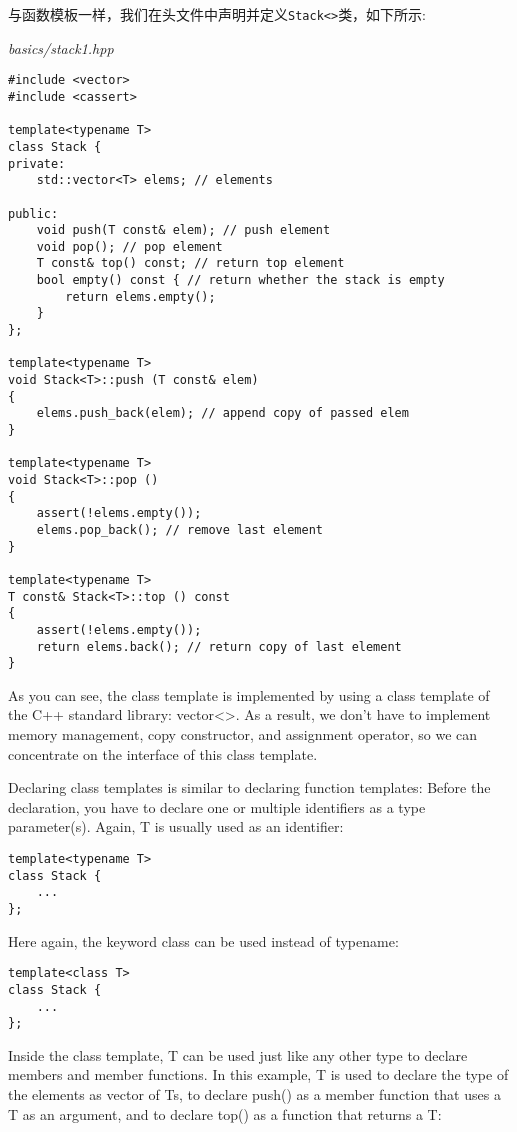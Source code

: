 
与函数模板一样，我们在头文件中声明并定义\texttt{Stack<>}类，如下所示:

\noindent
\textit{basics/stack1.hpp}
\begin{lstlisting}[style=styleCXX]
#include <vector>
#include <cassert>

template<typename T>
class Stack {
private:
	std::vector<T> elems; // elements
	
public:
	void push(T const& elem); // push element
	void pop(); // pop element
	T const& top() const; // return top element
	bool empty() const { // return whether the stack is empty
		return elems.empty();
	}
};

template<typename T>
void Stack<T>::push (T const& elem)
{
	elems.push_back(elem); // append copy of passed elem
}

template<typename T>
void Stack<T>::pop ()
{
	assert(!elems.empty());
	elems.pop_back(); // remove last element
}

template<typename T>
T const& Stack<T>::top () const
{
	assert(!elems.empty());
	return elems.back(); // return copy of last element
}
\end{lstlisting}

As you can see, the class template is implemented by using a class template of the C++ standard library: vector<>. As a result, we don’t have to implement memory management, copy constructor, and assignment operator, so we can concentrate on the interface of this class template.


Declaring class templates is similar to declaring function templates: Before the declaration, you have to declare one or multiple identifiers as a type parameter(s). Again, T is usually used as an identifier:

\begin{lstlisting}[style=styleCXX]
template<typename T>
class Stack {
	...
};
\end{lstlisting}

Here again, the keyword class can be used instead of typename:

\begin{lstlisting}[style=styleCXX]
template<class T>
class Stack {
	...
};
\end{lstlisting}

Inside the class template, T can be used just like any other type to declare members and member functions. In this example, T is used to declare the type of the elements as vector of Ts, to declare push() as a member function that uses a T as an argument, and to declare top() as a function that returns a T:

